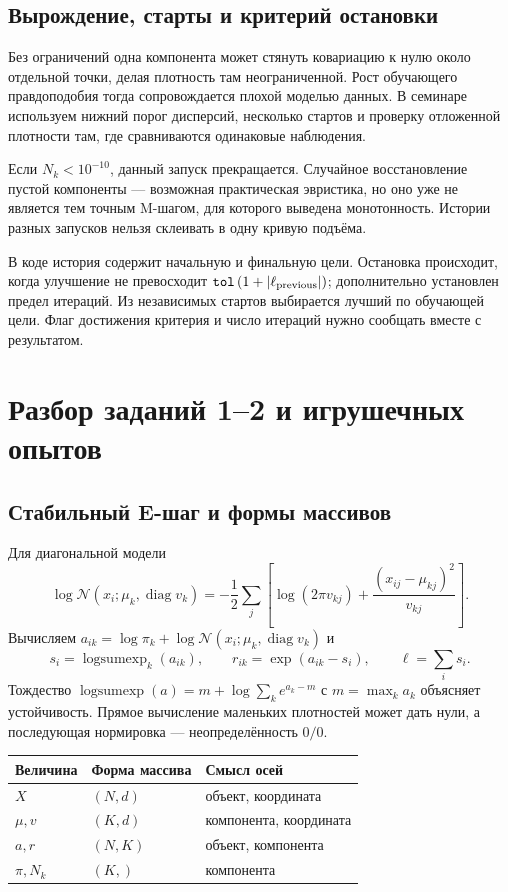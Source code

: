 \documentclass[11pt,a4paper]{article}
\newcommand{\Normal}{\mathcal N}
\newcommand{\LSE}{\operatorname{logsumexp}}
\newcommand{\diag}{\operatorname{diag}}
\begin{document}
\subsection{Вырождение, старты и критерий остановки}
Без ограничений одна компонента может стянуть ковариацию к нулю около
отдельной точки, делая плотность там неограниченной. Рост обучающего
правдоподобия тогда сопровождается плохой моделью данных.
В семинаре используем нижний порог дисперсий, несколько стартов и проверку
отложенной плотности там, где сравниваются одинаковые наблюдения.

Если $N_k<10^{-10}$, данный запуск прекращается. Случайное восстановление
пустой компоненты --- возможная практическая эвристика, но оно уже не
является тем точным M-шагом, для которого выведена монотонность.
Истории разных запусков нельзя склеивать в одну кривую подъёма.

В коде история содержит начальную и финальную цели. Остановка происходит,
когда улучшение не превосходит
$\texttt{tol}\,(1+|\ell_{\rm previous}|)$; дополнительно установлен предел
итераций. Из независимых стартов выбирается лучший по обучающей цели.
Флаг достижения критерия и число итераций нужно сообщать вместе с результатом.

\section{Разбор заданий 1--2 и игрушечных опытов}

\subsection{Стабильный E-шаг и формы массивов}
Для диагональной модели
\[
 \log\Normal(x_i;\mu_k,\diag v_k)
 =-\frac12\sum_j\left[\log(2\pi v_{kj})+
                           \frac{(x_{ij}-\mu_{kj})^2}{v_{kj}}\right].
\]
Вычисляем $a_{ik}=\log\pi_k+\log\Normal(x_i;\mu_k,\diag v_k)$ и
\[
 s_i=\LSE_k(a_{ik}),\qquad r_{ik}=\exp(a_{ik}-s_i),\qquad
 \ell=\sum_i s_i.
\]
Тождество $\LSE(a)=m+\log\sum_k e^{a_k-m}$ с $m=\max_k a_k$
объясняет устойчивость. Прямое вычисление маленьких плотностей может дать
нули, а последующая нормировка --- неопределённость $0/0$.

\begin{center}
\begin{tabular}{lll}
\toprule
Величина & Форма массива & Смысл осей\\
\midrule
$X$ & $(N,d)$ & объект, координата\\
$\mu,v$ & $(K,d)$ & компонента, координата\\
$a,r$ & $(N,K)$ & объект, компонента\\
$\pi,N_k$ & $(K,)$ & компонента\\
\bottomrule
\end{tabular}
\end{center}
\end{document}
